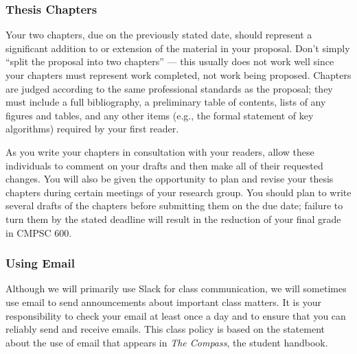 \documentclass[11pt]{article}
\begin{document}
\subsubsection*{Thesis Chapters}

Your two chapters, due on the previously stated date, should represent a
significant addition to or extension of the material in your proposal. Don't
simply ``split the proposal into two chapters'' --- this usually does not work
well since your chapters must represent work completed, not work being proposed.
Chapters are judged according to the same professional standards as the
proposal; they must include a full bibliography, a preliminary table of
contents, lists of any figures and tables, and any other items (e.g., the formal
statement of key algorithms) required by your first reader.

As you write your chapters in consultation with your readers, allow these
individuals to comment on your drafts and then make all of their requested
changes. You will also be given the opportunity to plan and revise your thesis
chapters during certain meetings of your research group. You should plan to
write several drafts of the chapters before submitting them on the due date;
failure to turn them by the stated deadline will result in the reduction of your
final grade in CMPSC 600.



\subsubsection*{Using Email}

Although we will primarily use Slack for class communication, we will sometimes use email to send announcements about
important class matters. It is your responsibility to check your email at least once a day and to ensure that you can
reliably send and receive emails. This class policy is based on the statement about the use of email that appears in
{\em The Compass}, the student handbook.
\end{document}
